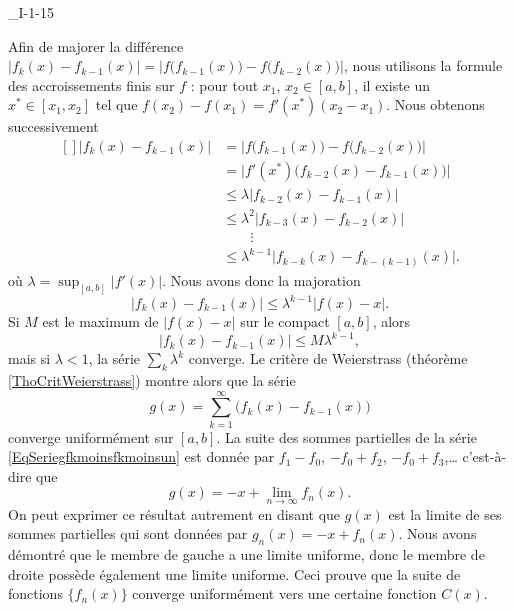 

\begin{corrige}{_I-1-15}

Afin de majorer la différence $| f_k(x)-f_{k-1}(x) |=| f\big( f_{k-1}(x) \big)-f\big( f_{k-2}(x) \big) |$, nous utilisons la formule des accroissements finis sur $f$ : pour tout $x_1$, $x_2\in[a,b]$, il existe un $x^*\in[x_1,x_2]$ tel que $f(x_2)-f(x_1)=f'(x^*)(x_2-x_1)$. Nous obtenons successivement 
\begin{equation}
	\begin{aligned}[]
		| f_k(x)-f_{k-1}(x) |	&=	\Big| f\big( f_{k-1}(x) \big)-f\big( f_{k-2}(x) \big) \Big|\\
					&=	\Big| f'(x^*)\big( f_{k-2}(x)-f_{k-1}(x) \big)  \Big|\\
					&\leq	\lambda\big| f_{k-2}(x)-f_{k-1}(x) \big|\\
					&\leq	\lambda^2\big| f_{k-3}(x)-f_{k-2}(x) \big|\\
					&\qquad\vdots	\\
					&\leq	\lambda^{k-1}\big| f_{k-k}(x)-f_{k-(k-1)}(x) \big|.
	\end{aligned}
\end{equation}
où $\lambda=\sup_{[a,b]}| f'(x) |$. Nous avons donc la majoration
\begin{equation}
	| f_k(x)-f_{k-1}(x)|\leq \lambda^{k-1}| f(x)-x |.
\end{equation}
Si $M$ est le maximum de $| f(x)-x |$ sur le compact $[a,b]$, alors
\begin{equation}
	| f_k(x)-f_{k-1}(x)|\leq M\lambda^{k-1},
\end{equation}
mais si $\lambda<1$, la série $\sum_k\lambda^k$ converge. Le critère de Weierstrass (théorème \ref{ThoCritWeierstrass}) montre alors que la série
\begin{equation}		\label{EqSeriegfkmoinsfkmoinsun}
	g(x)=\sum_{k=1}^{\infty}\big( f_k(x)-f_{k-1}(x) \big)
\end{equation}
converge uniformément sur $[a,b]$. La suite des sommes partielles de la série \eqref{EqSeriegfkmoinsfkmoinsun} est donnée par $f_1-f_0$, $-f_0+f_2$, $-f_0+f_3$,\ldots{} c'est-à-dire que
\begin{equation}
	g(x)=-x+\lim_{n\to\infty}f_n(x).
\end{equation}
On peut exprimer ce résultat autrement en disant que $g(x)$ est la limite de ses sommes partielles qui sont données par $g_n(x)=-x+f_n(x)$. Nous avons démontré que le membre de gauche a une limite uniforme, donc le membre de droite possède également une limite uniforme. Ceci prouve que la suite de fonctions $\{ f_n(x) \}$ converge uniformément vers une certaine fonction $C(x)$.


\end{corrige}
